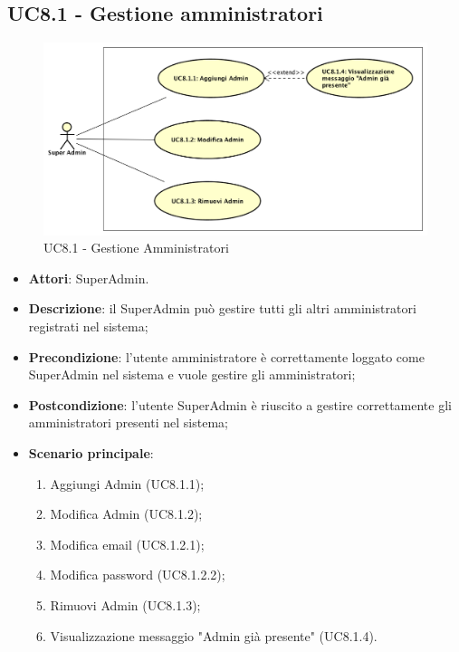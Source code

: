 \documentclass[../AnalisiDeiRequisiti_v3.0.0.tex]{subfiles}
\begin{document}
\subsection{UC8.1 - Gestione amministratori} 
\label{sssec:UC8.1} 
\begin{figure}[!h]
	\centering
	\includegraphics[width=\textwidth]{UseCases/UC8_GestionePannelloSuperadmin/UC8_1_GestioneAmministratori/UC8_1_GestioneAmministratori.png}
	\caption{UC8.1 - Gestione Amministratori}
\end{figure}
\begin{itemize} 
\item \textbf{Attori}: SuperAdmin.
\item \textbf{Descrizione}: il SuperAdmin può gestire tutti gli altri amministratori registrati nel sistema;
\item \textbf{Precondizione}: l'utente amministratore è correttamente loggato come SuperAdmin nel sistema e vuole gestire gli amministratori;
\item \textbf{Postcondizione}: l'utente SuperAdmin è riuscito a gestire correttamente gli amministratori presenti nel sistema;
\item \textbf{Scenario principale}: \begin{enumerate}\item Aggiungi Admin (UC8.1.1);\item Modifica Admin (UC8.1.2);\item Modifica email (UC8.1.2.1);\item Modifica password (UC8.1.2.2);\item Rimuovi Admin (UC8.1.3);\item Visualizzazione messaggio "Admin già presente" (UC8.1.4). 
 \end{enumerate}
\end{itemize} 
\end{document}
